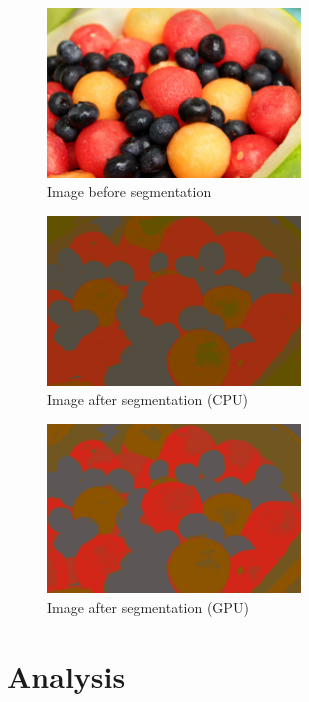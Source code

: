 \documentclass[11pt]{article}
\begin{document}
\begin{figure}[ht]
    \centering
    \includegraphics[width=0.6\textwidth]{fruit.png}
    \caption{Image\cite{fruit} before segmentation}
    \label{fig:fruit}
\end{figure}


\begin{figure}[ht]
    \centering
    \includegraphics[width=0.6\textwidth]{fruit-segmented-cpu.png}
    \caption{Image after segmentation (CPU)}
    \label{fig:fruit-segmented-cpu}
\end{figure}


\begin{figure}[ht]
    \centering
    \includegraphics[width=0.6\textwidth]{fruit-segmented-gpu.png}
    \caption{Image after segmentation (GPU)}
    \label{fig:fruit-segmented-gpu}
\end{figure}


\section{Analysis}
\end{document}
